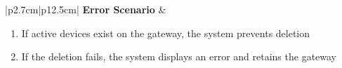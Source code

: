 \begin{table}[H]
\begin{tabular}{|p{2.7cm}|p{12.5cm}|}
        \hline
        \textbf{Error Scenario} & \begin{minipage}[t]{\linewidth}
                                      \begin{enumerate}[topsep=0pt,itemsep=1pt,parsep=0pt,partopsep=0pt]
                                          \item If active devices exist on the gateway, the system prevents deletion
                                          \item If the deletion fails, the system displays an error and retains the gateway
                                      \end{enumerate}
                                  \end{minipage}  \\
        \hline
    \end{tabular}
    \label{tab:admin-delete-gateway}
\end{table}
